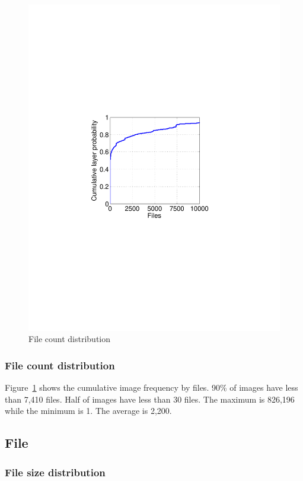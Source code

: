 \begin{figure}
\begin{minipage}{0.26\textwidth}
		\includegraphics[width=1\textwidth]{graphs/file_cnt.pdf}
		\caption{File count distribution}
		\label{fig_file_cnt}
	\end{minipage}
\end{figure}

\subsubsection{File count distribution}

Figure~\ref{fig_file_cnt} shows the cumulative image frequency by files. 90\% of images have less than 7,410 files. Half of images have less than 30 files. The maximum is 826,196 while the minimum is 1. The average is 2,200.

\subsection{File}

\subsubsection{File size distribution}

